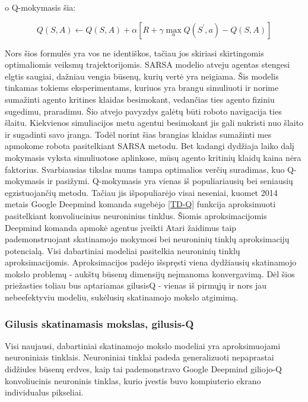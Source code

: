 \documentclass[a4paper, 12pt]{article}
\begin{document}
o Q-mokymasis šia:

\begin{equation}
\label{TD-Q}
Q(S, A) \leftarrow Q(S, A)+\alpha\left[R+\gamma \max _{a} Q\left(S^{\prime}, a\right)-Q(S, A)\right]
\end{equation}

Nors šios formulės yra vos ne identiškos, tačiau jos skiriasi skirtingomis optimaliomis veiksmų trajektorijomis. SARSA modelio atveju agentas stengesi elgtis saugiai, dažniau vengia būsenų, kurių vertė yra neigiama. Šis modelis tinkamas tokiems eksperimentams, kuriuos yra brangu simuliuoti ir norime sumažinti agento kritines klaidas besimokant, vedančias ties agento fiziniu sugedimu, praradimu. Šio atvejo pavyzdys galėtų būti roboto navigacija ties šlaitu. Kiekvienos simuliacijos metu agentui besimokant jis gali nukristi nuo šlaito ir sugadinti savo įranga. Todėl norint šias brangias klaidas sumažinti mes apmokome robota pasitelkiant SARSA metodu. Bet kadangi dydžiaja laiko dalį mokymasis vyksta simuliuotose aplinkose, mūsų agento kritinių klaidų kaina nėra faktorius. Svarbiausias tikslas mums tampa optimalios verčių suradimas, kuo Q-mokymasis ir pasižymi. Q-mokymasis \cite{QLearning} yra vienas iš populiariausių bei seniausių egzistuojančių metodu. Tačiau jis išpopuliarėjo visai neseniai, kuomet 2014 metais Google Deepmind komanda sugebėjo \ref{TD-Q} funkcija aproksimuoti pasitelkiant konvoliucinius neuroninius tinklus. Šiomis aproksimacijomis Deepmind komanda apmokė agentus įveikti Atari žaidimus taip pademonstruojant skatinamojo mokymosi bei neuroninių tinklų aproksimacijų potencialą. Visi dabartiniai modeliai pasitelkia neuroninių tinklų aproksimacijomis. Aproksimacijos padėjo išspręsti viena dydžiausių skatinamojo mokslo problemų - aukštų būsenų dimensijų neįmanoma konvergavimą. Dėl šios priežasties toliau bus aptariamas gilusisQ - vienas iš pirmųjų ir nors jau nebeefektyviu modeliu, sukėlusių skatinamojo mokslo atgimimą.

\subsubsection{Gilusis skatinamasis mokslas, gilusis-Q}

Visi naujausi, dabartiniai skatinamojo mokslo modeliai yra aproksimuojami neuroniniais tinklais. Neuroniniai tinklai padeda generalizuoti nepaprastai didžiules būsenų erdves, kaip tai pademonstravo Google Deepmind giliojo-Q konvoliucinis neuroninis tinklas, kurio įvestis buvo kompiuterio ekrano individualus pikseliai. 
\end{document}
